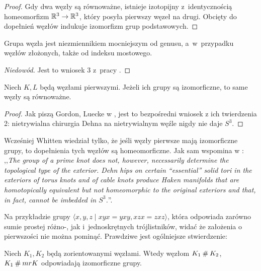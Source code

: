 \begin{proof}
    Gdy dwa węzły są równoważne, istnieje izotopijny z~identycznością homeomorfizm $\mathbb R^3 \to \mathbb R^3$, który posyła pierwszy węzeł na drugi.
    Obcięty do dopełnień węzłów indukuje izomorfizm grup podstawowych.
\end{proof}

\begin{proposition}
    Grupa węzła jest niezmiennikiem mocniejszym od genusu, a~w~przypadku węzłów złożonych, także od indeksu mostowego.
\end{proposition}

\begin{proof}[Niedowód]
    Jest to wniosek 3 z~pracy \cite{feustel78}.
\end{proof}

\begin{proposition}
    Niech $K, L$ będą węzłami pierwszymi.
    Jeżeli ich grupy są izomorficzne, to same węzły są równoważne.
\end{proposition}

\begin{proof}
    Jak piszą Gordon, Luecke w \cite{gordon89}, jest to bezpośredni wniosek z ich twierdzenia 2: nietrywialna chirurgia Dehna na nietrywialnym węźle nigdy nie daje $S^3$.
\end{proof}

Wcześniej Whitten wiedział tylko, że jeśli węzły pierwsze mają izomorficzne grupy, to dopełnienia tych węzłów są homeomorficzne.
Jak sam wspomina w \cite{whitten87}: ,,\emph{The group of a prime knot does not, however, necessarily determine the topological type of the exterior. Dehn hips on certain “essential” solid tori in the exteriors of torus knots and of cable knots produce Haken manifolds that are homotopically equivalent but not homeomorphic to the original exteriors and that, in fact, cannot be imbedded in $S^3$.}''.

Na przykładzie grupy $\langle x,y,z \mid xyx=yxy,xzx=zxz\rangle$, która odpowiada zarówno sumie prostej różno-, jak i~jednoskrętnych trójlistników, widać że założenia o pierwszości nie można pominąć.
Prawdziwe jest ogólniejsze stwierdzenie:

\begin{proposition}
    \label{prop:knot_group_sum}
    Niech $K_1, K_2$ będą zorientowanymi węzłami.
    Wtedy węzłom $K_1 \mathbin{\#} K_2$, $K_1 \mathbin{\#} mr K$ odpowiadają izomorficzne grupy.
\end{proposition}

